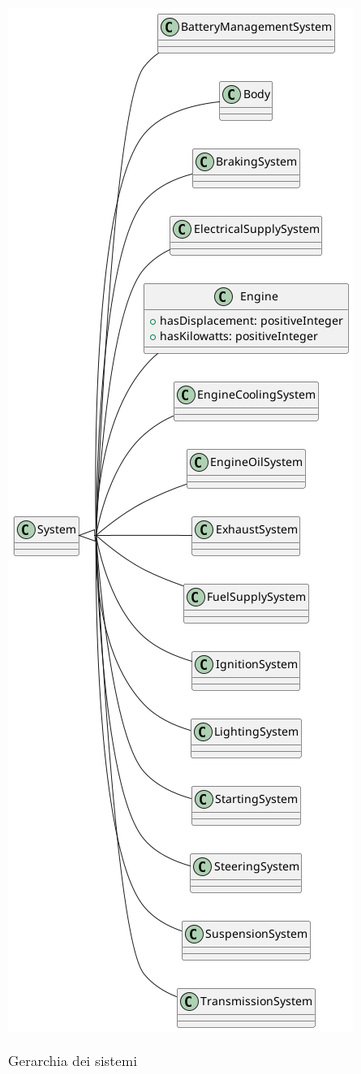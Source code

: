 \begin{figure}[H]
    \caption{Gerarchia dei sistemi}
    \includegraphics[height=\textheight]{figures/carpedia-system.png}
    \label{fig:carpedia-system}
\end{figure}

